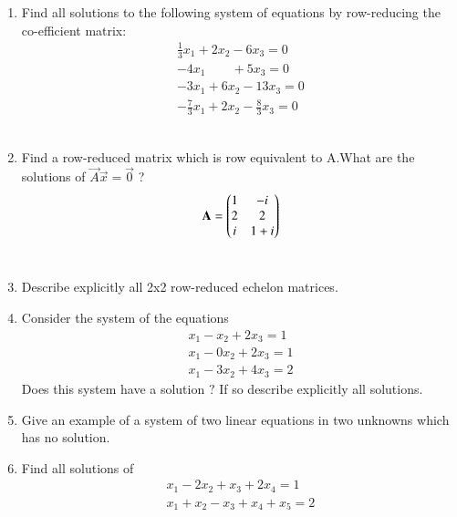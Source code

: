 \renewcommand{\theequation}{\theenumi}
\renewcommand{\thefigure}{\theenumi}
\begin{enumerate}[label=\thesubsection.\arabic*.,ref=\thesubsection.\theenumi]
%
\item Find all solutions to the following system of equations by row-reducing the co-efficient matrix:
\begin{align}
\frac{1}{3}x_1 +2x_2 - 6x_3 =0\\
-4x_1\quad \quad+ 5x_3=0\\
-3x_1+6x_2-13x_3=0\\
-\frac{7}{3}x_1 +2x_2 - \frac{8}{3}x_3 =0
\end{align}
\\
\solution

%
\item Find a row-reduced matrix which is row equivalent to A.What are the solutions of 
$\vec{A}\vec{x}=\vec{0}$ ?
\begin{align}
\mathbf{A} = \begin{pmatrix}1&-i\\2&2\\i& 1+i\end{pmatrix}\label{eq:solutions/1/3/2/A}
\end{align}
%
\\
\solution

%
\item  Describe explicitly all 2x2 row-reduced echelon matrices.
%
\\
\solution

\item 
Consider the system of the equations
\begin{align}
x_1 - x_2 +2x_3 = 1  \label{eq:solutions/1/3/4/1.1} \\
x_1 - 0x_2 + 2x_3 = 1 \label{eq:solutions/1/3/4/1.2} \\
x_1 -3x_2 + 4x_3 = 2 \label{eq:solutions/1/3/4/1.3}
\end{align}
%
Does this system have a solution $?$  If   so describe explicitly all solutions.
%
\\
\solution

%
\item  Give an example of a system of two linear equations in two unknowns which
has no solution.
%
\\
\solution

\item Find all solutions of
 \begin{align}
 x_1-2x_2+x_3+2x_4=1 \nonumber\\
 x_1+x_2-x_3+x_4+x_5=2\nonumber\\\

\end{align}
\end{enumerate}

